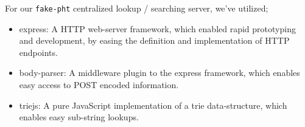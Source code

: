 For our \verb|fake-pht| centralized lookup / searching server, we've utilized;
\begin{itemize}
\item express: A \acs{HTTP} web-server framework, which enabled rapid prototyping and
        development, by easing the definition and implementation of \acs{HTTP} endpoints.
\item body-parser: A middleware plugin to the express framework, which enables 
        easy access to POST encoded information.
\item triejs: A pure JavaScript implementation of a trie data-structure, which 
        enables easy sub-string lookups.
\end{itemize}
